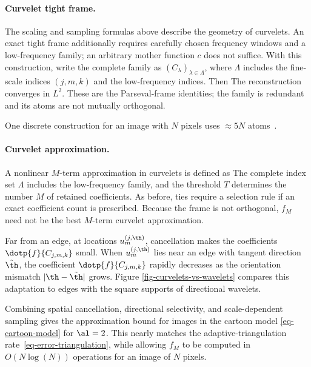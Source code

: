   
\paragraph{Curvelet tight frame.}

The scaling and sampling formulas above describe the geometry of curvelets. An exact tight frame additionally requires carefully chosen frequency windows and a low-frequency family; an arbitrary mother function $c$ does not suffice. With this construction, write the complete family as $(C_\lambda)_{\lambda\in\Lambda}$, where $\Lambda$ includes the fine-scale indices $(j,m,k)$ and the low-frequency indices. Then
The reconstruction converges in $L^2$. These are the Parseval-frame identities; the family is redundant and its atoms are not mutually orthogonal.

One discrete construction for an image with $N$ pixels uses $\approx 5 N$ atoms~\cite{candes-discrete-curvelet}.

  
\paragraph{Curvelet approximation.}

A nonlinear $M$-term approximation in curvelets is defined as
The complete index set $\Lambda$ includes the low-frequency family, and the threshold $T$ determines the number $M$ of retained coefficients. As before, ties require a selection rule if an exact coefficient count is prescribed. Because the frame is not orthogonal, $f_M$ need not be the best $M$-term curvelet approximation.

Far from an edge, at locations $u_m^{(j,\th)}$, cancellation makes the coefficients $\dotp{f}{C_{j,m,k}}$ small. When $u_m^{(j,\th)}$ lies near an edge with tangent direction $\tilde\th$, the coefficient $\dotp{f}{C_{j,m,k}}$ rapidly decreases as the orientation mismatch $|\th-\tilde \th|$ grows. Figure \ref{fig-curvelets-vs-wavelets} compares this adaptation to edges with the square supports of directional wavelets.



Combining spatial cancellation, directional selectivity, and scale-dependent sampling gives the approximation bound
for images in the cartoon model \eqref{eq-cartoon-model} for $\al=2$.
This nearly matches the adaptive-triangulation rate~\eqref{eq-error-triangulation}, while allowing $f_M$ to be computed in $O(N \log(N))$ operations for an image of $N$ pixels.

